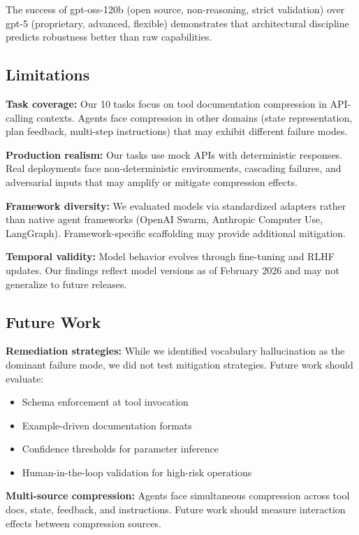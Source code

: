 \documentclass[11pt]{article}
\begin{document}
The success of gpt-oss-120b (open source, non-reasoning, strict validation) over gpt-5 (proprietary, advanced, flexible) demonstrates that architectural discipline predicts robustness better than raw capabilities.

\subsection{Limitations}

\textbf{Task coverage:} Our 10 tasks focus on tool documentation compression in API-calling contexts. Agents face compression in other domains (state representation, plan feedback, multi-step instructions) that may exhibit different failure modes.

\textbf{Production realism:} Our tasks use mock APIs with deterministic responses. Real deployments face non-deterministic environments, cascading failures, and adversarial inputs that may amplify or mitigate compression effects.

\textbf{Framework diversity:} We evaluated models via standardized adapters rather than native agent frameworks (OpenAI Swarm, Anthropic Computer Use, LangGraph). Framework-specific scaffolding may provide additional mitigation.

\textbf{Temporal validity:} Model behavior evolves through fine-tuning and RLHF updates. Our findings reflect model versions as of February 2026 and may not generalize to future releases.

\subsection{Future Work}

\textbf{Remediation strategies:} While we identified vocabulary hallucination as the dominant failure mode, we did not test mitigation strategies. Future work should evaluate:
\begin{itemize}
\item Schema enforcement at tool invocation
\item Example-driven documentation formats
\item Confidence thresholds for parameter inference
\item Human-in-the-loop validation for high-risk operations
\end{itemize}

\textbf{Multi-source compression:} Agents face simultaneous compression across tool docs, state, feedback, and instructions. Future work should measure interaction effects between compression sources.
\end{document}
